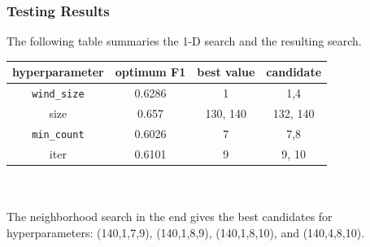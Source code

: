 \documentclass{sig-alternate-05-2015}
\begin{document}
	\subsubsection{Testing Results}
	The following table summaries the 1-D search and the resulting search. \\
	\begin{tabular}{|c|c|c|c|}
		\hline 
		hyperparameter & optimum F1 & best value & candidate \\
		\hline 
		\texttt{wind\_size} &  0.6286 & 1 & 1,4\\ 
		\hline 
		size & 0.657 & 130, 140  & 132, 140 \\
		\hline 
		\texttt{min\_count} & 0.6026 & 7 & 7,8 \\
		\hline 
		iter & 0.6101 & 9 & 9, 10 \\
		\hline 
	\end{tabular}
\\
\\
	The neighborhood search in the end gives the best candidates for hyperparameters: (140,1,7,9), (140,1,8,9), (140,1,8,10), and (140,4,8,10).
	
\end{document}
